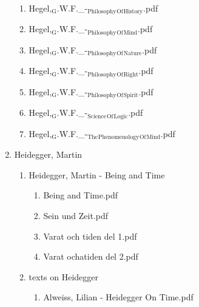\documentclass[11pt]{article}
\begin{document}
\begin{enumerate}
\begin{enumerate}
\begin{enumerate}
\begin{enumerate}
\begin{enumerate}
\begin{enumerate}
\begin{enumerate}
\item Hegel,$_{\text{G}}$.W.F.\_-$_{\text{Philosophy}}$$_{\text{Of}}$$_{\text{History}}$.pdf
\label{sec-1-1-1-1-7-3-39-13-36-4}

\item Hegel,$_{\text{G}}$.W.F.\_-$_{\text{Philosophy}}$$_{\text{Of}}$$_{\text{Mind}}$.pdf
\label{sec-1-1-1-1-7-3-39-13-36-5}

\item Hegel,$_{\text{G}}$.W.F.\_-$_{\text{Philosophy}}$$_{\text{Of}}$$_{\text{Nature}}$.pdf
\label{sec-1-1-1-1-7-3-39-13-36-6}

\item Hegel,$_{\text{G}}$.W.F.\_-$_{\text{Philosophy}}$$_{\text{Of}}$$_{\text{Right}}$.pdf
\label{sec-1-1-1-1-7-3-39-13-36-7}

\item Hegel,$_{\text{G}}$.W.F.\_-$_{\text{Philosophy}}$$_{\text{Of}}$$_{\text{Spirit}}$.pdf
\label{sec-1-1-1-1-7-3-39-13-36-8}

\item Hegel,$_{\text{G}}$.W.F.\_-$_{\text{Science}}$$_{\text{Of}}$$_{\text{Logic}}$.pdf
\label{sec-1-1-1-1-7-3-39-13-36-9}

\item Hegel,$_{\text{G}}$.W.F.\_-$_{\text{The}}$$_{\text{Phenomenology}}$$_{\text{Of}}$$_{\text{Mind}}$.pdf
\label{sec-1-1-1-1-7-3-39-13-36-10}
\end{enumerate}

\item Heidegger, Martin
\label{sec-1-1-1-1-7-3-39-13-37}
\begin{enumerate}
\item Heidegger, Martin - Being and Time
\label{sec-1-1-1-1-7-3-39-13-37-1}
\begin{enumerate}
\item Being and Time.pdf
\label{sec-1-1-1-1-7-3-39-13-37-1-1}

\item Sein und Zeit.pdf
\label{sec-1-1-1-1-7-3-39-13-37-1-2}

\item Varat och tiden del 1.pdf
\label{sec-1-1-1-1-7-3-39-13-37-1-3}

\item Varat ochatiden del 2.pdf
\label{sec-1-1-1-1-7-3-39-13-37-1-4}
\end{enumerate}

\item texts on Heidegger
\label{sec-1-1-1-1-7-3-39-13-37-2}
\begin{enumerate}
\item Alweiss, Lilian - Heidegger On Time.pdf
\label{sec-1-1-1-1-7-3-39-13-37-2-1}


\end{enumerate}
\end{enumerate}
\end{enumerate}
\end{enumerate}
\end{enumerate}
\end{enumerate}
\end{enumerate}
\end{enumerate}
\end{document}
